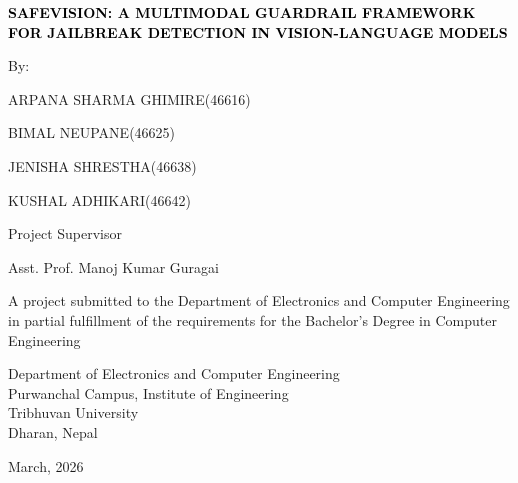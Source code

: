 \begin{titlepage}
    \centering
    
    {\fontsize{12pt}{14pt}\bfseries\textcolor{black}{SAFEVISION: A MULTIMODAL GUARDRAIL FRAMEWORK FOR JAILBREAK DETECTION IN VISION-LANGUAGE MODELS}\par}
    \vspace{2.0cm}
       {By:}  \par ARPANA SHARMA GHIMIRE(46616)
      \par BIMAL NEUPANE(46625)
      \par JENISHA SHRESTHA(46638)
      \par KUSHAL ADHIKARI(46642)
       \vspace{2.0cm}\par
    Project Supervisor\par
    Asst. Prof. Manoj Kumar Guragai\par
    \vspace{1.6cm}
    {A project submitted to the Department of Electronics and Computer Engineering in partial fulfillment of the requirements for the Bachelor’s Degree in Computer Engineering}\par
        \vspace{1.6cm}\par

\vspace{1.2cm} 

  {\fontsize{13pt}{15pt}\selectfont
\color{black}
Department of Electronics and Computer Engineering\\ Purwanchal Campus, Institute of Engineering \\ Tribhuvan University\\ Dharan, Nepal}

        \vspace{1.2cm}\par
        
   {March, 2026}
   
\end{titlepage}



